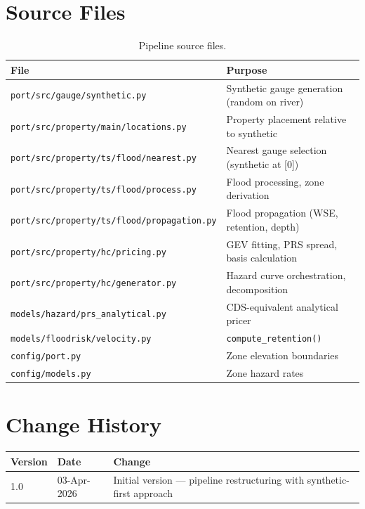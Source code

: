 \documentclass[11pt,a4paper]{article}
\begin{document}
\clearpage
\begin{appendices}

\section{Source Files}

\begin{table}[H]
    \centering
    \caption{Pipeline source files.}
    \begin{tabular}{lp{8cm}}
        \toprule
        \textbf{File} & \textbf{Purpose} \\
        \midrule
        \texttt{port/src/gauge/synthetic.py}           & Synthetic gauge generation (random on river) \\
        \texttt{port/src/property/main/locations.py}   & Property placement relative to synthetic \\
        \texttt{port/src/property/ts/flood/nearest.py} & Nearest gauge selection (synthetic at [0]) \\
        \texttt{port/src/property/ts/flood/process.py} & Flood processing, zone derivation \\
        \texttt{port/src/property/ts/flood/propagation.py} & Flood propagation (WSE, retention, depth) \\
        \texttt{port/src/property/hc/pricing.py}       & GEV fitting, PRS spread, basis calculation \\
        \texttt{port/src/property/hc/generator.py}     & Hazard curve orchestration, decomposition \\
        \texttt{models/hazard/prs\_analytical.py}       & CDS-equivalent analytical pricer \\
        \texttt{models/floodrisk/velocity.py}          & \texttt{compute\_retention()} \\
        \texttt{config/port.py}                        & Zone elevation boundaries \\
        \texttt{config/models.py}                      & Zone hazard rates \\
        \bottomrule
    \end{tabular}
\end{table}

\section{Change History}

\begin{table}[H]
    \centering
    \begin{tabular}{lll}
        \toprule
        \textbf{Version} & \textbf{Date} & \textbf{Change} \\
        \midrule
        1.0 & 03-Apr-2026 & Initial version --- pipeline restructuring with synthetic-first approach \\
        \bottomrule
    \end{tabular}
\end{table}

\end{appendices}
\end{document}
